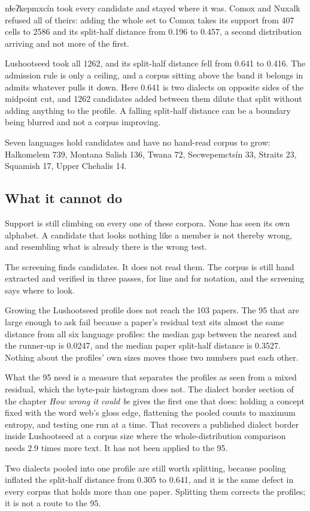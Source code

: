 nɬeʔkepmxcín took every candidate and stayed where it was. Comox and Nuxalk refused all of theirs: adding the whole set to Comox takes its support from 407 cells to 2586 and its split-half distance from 0.196 to 0.457, a second distribution arriving and not more of the first.

Lushootseed took all 1262, and its split-half distance fell from 0.641 to 0.416. The admission rule is only a ceiling, and a corpus sitting above the band it belongs in admits whatever pulls it down. Here 0.641 is two dialects on opposite sides of the midpoint cut, and 1262 candidates added between them dilute that split without adding anything to the profile. A falling split-half distance can be a boundary being blurred and not a corpus improving.

Seven languages hold candidates and have no hand-read corpus to grow: Halkomelem 739, Montana Salish 136, Twana 72, Secwepemctsín 33, Straits 23, Squamish 17, Upper Chehalis 14.

\subsection{What it cannot do}

Support is still climbing on every one of these corpora. None has seen its own alphabet. A candidate that looks nothing like a member is not thereby wrong, and resembling what is already there is the wrong test.

The screening finds candidates. It does not read them. The corpus is still hand extracted and verified in three passes, for line and for notation, and the screening says where to look.

Growing the Lushootseed profile does not reach the 103 papers. The 95 that are large enough to ask fail because a paper's residual text sits almost the same distance from all six language profiles: the median gap between the nearest and the runner-up is 0.0247, and the median paper split-half distance is 0.3527. Nothing about the profiles' own sizes moves those two numbers past each other.

What the 95 need is a measure that separates the profiles as seen from a mixed residual, which the byte-pair histogram does not. The dialect border section of the chapter \emph{How wrong it could be} gives the first one that does: holding a concept fixed with the word web's gloss edge, flattening the pooled counts to maximum entropy, and testing one run at a time. That recovers a published dialect border inside Lushootseed at a corpus size where the whole-distribution comparison needs 2.9 times more text. It has not been applied to the 95.

Two dialects pooled into one profile are still worth splitting, because pooling inflated the split-half distance from 0.305 to 0.641, and it is the same defect in every corpus that holds more than one paper. Splitting them corrects the profiles; it is not a route to the 95.
